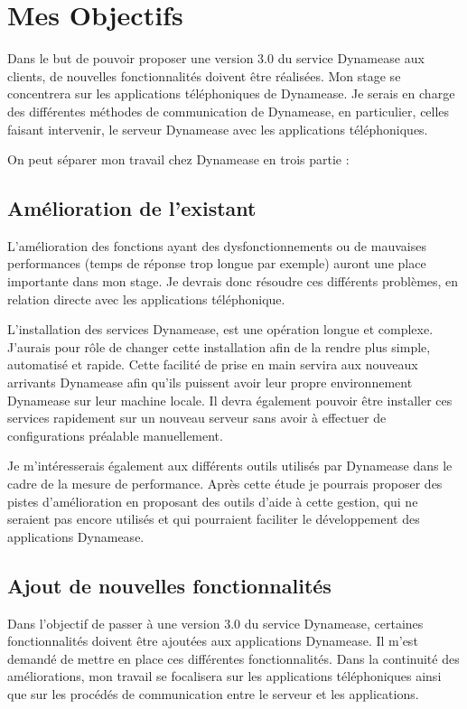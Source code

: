 \section{Mes Objectifs}

 Dans le but de pouvoir proposer une version 3.0 du service Dynamease aux clients, de nouvelles fonctionnalités doivent être réalisées. Mon stage se concentrera sur les applications téléphoniques de Dynamease. Je serais en charge des différentes méthodes de communication de Dynamease, en particulier, celles faisant intervenir, le serveur Dynamease avec les applications téléphoniques.

On peut séparer mon travail chez Dynamease en trois partie :

\subsection{Amélioration de l'existant}

L'amélioration des fonctions ayant des dysfonctionnements ou de mauvaises performances (temps de réponse trop longue par exemple) auront une place importante dans mon stage. Je devrais donc résoudre ces différents problèmes, en relation directe avec les applications téléphonique.

L'installation des services Dynamease, est une opération longue et complexe. J'aurais pour rôle de changer cette installation afin de la rendre plus simple, automatisé et rapide. Cette facilité de prise en main servira aux nouveaux arrivants Dynamease afin qu'ils puissent avoir leur propre environnement Dynamease sur leur machine locale. Il devra également pouvoir être installer ces services rapidement sur un nouveau serveur sans avoir à effectuer de configurations préalable manuellement.

Je m’intéresserais également aux différents outils utilisés par Dynamease dans le cadre de la mesure de performance. Après cette étude je pourrais proposer des pistes d'amélioration en proposant des outils d'aide à cette gestion, qui ne seraient pas encore utilisés et qui pourraient faciliter le développement des applications Dynamease.


\subsection{Ajout de nouvelles fonctionnalités}

Dans l'objectif de passer à une version 3.0 du service Dynamease, certaines fonctionnalités doivent être ajoutées aux applications Dynamease. Il m'est demandé de mettre en place ces différentes fonctionnalités. Dans la continuité des améliorations, mon travail se focalisera sur les applications téléphoniques ainsi que sur les procédés de communication entre le serveur et les applications.

